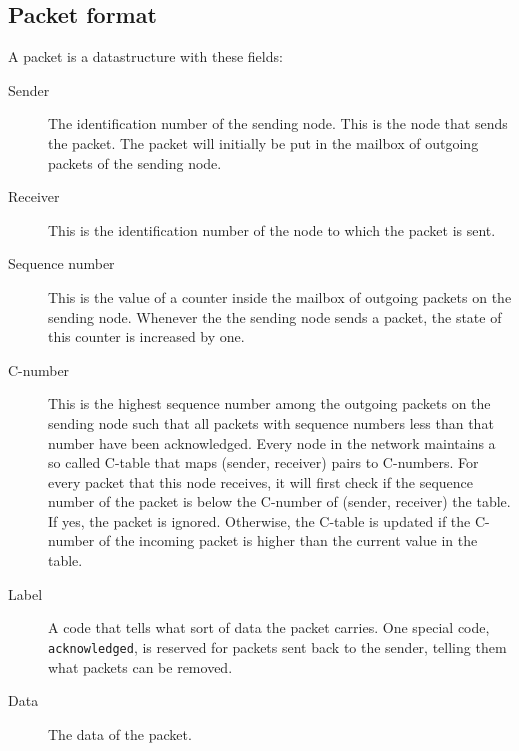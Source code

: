\documentclass{article}
\begin{document}
\subsection{Packet format}
A packet is a datastructure with these fields:
\begin{description}
  \item[Sender] The identification number of the sending node. This is the node that sends the packet. The packet will initially be put in the mailbox of outgoing packets of the sending node.
  \item[Receiver] This is the identification number of the node to which the packet is sent.
  \item[Sequence number] This is the value of a counter inside the mailbox of outgoing packets on the sending node. Whenever the the sending node sends a packet, the state of this counter is increased by one.
  \item[C-number] This is the highest sequence number among the outgoing packets on the sending node such that all packets with sequence numbers less than that number have been acknowledged. Every node in the network maintains a so called C-table that maps (sender, receiver) pairs to C-numbers. For every packet that this node receives, it will first check if the sequence number of the packet is below the C-number of (sender, receiver) the table. If yes, the packet is ignored. Otherwise, the C-table is updated if the C-number of the incoming packet is higher than the current value in the table.
  \item[Label] A code that tells what sort of data the packet carries. One special code, \texttt{acknowledged}, is reserved for packets sent back to the sender, telling them what packets can be removed.
  \item[Data] The data of the packet.
\end{description}
\end{document}
